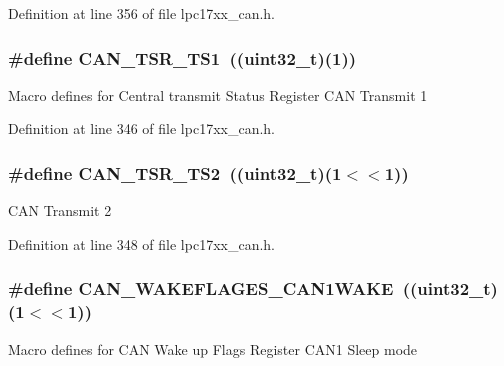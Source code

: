 \-Definition at line 356 of file lpc17xx\-\_\-can.\-h.

\hypertarget{group___c_a_n___private___macros_ga8f089fc39cd19120472ef0262bdad557}{
\subsubsection[{\-C\-A\-N\-\_\-\-T\-S\-R\-\_\-\-T\-S1}]{\setlength{\rightskip}{0pt plus 5cm}\#define {\bf \-C\-A\-N\-\_\-\-T\-S\-R\-\_\-\-T\-S1}~((uint32\-\_\-t)(1))}}\label{group___c_a_n___private___macros_ga8f089fc39cd19120472ef0262bdad557}
\-Macro defines for \-Central transmit \-Status \-Register \-C\-A\-N \-Transmit 1 

\-Definition at line 346 of file lpc17xx\-\_\-can.\-h.

\hypertarget{group___c_a_n___private___macros_ga5dbea4a4e383d12856abf6bd5ef999c9}{
\subsubsection[{\-C\-A\-N\-\_\-\-T\-S\-R\-\_\-\-T\-S2}]{\setlength{\rightskip}{0pt plus 5cm}\#define {\bf \-C\-A\-N\-\_\-\-T\-S\-R\-\_\-\-T\-S2}~((uint32\-\_\-t)(1$<$$<$1))}}\label{group___c_a_n___private___macros_ga5dbea4a4e383d12856abf6bd5ef999c9}
\-C\-A\-N \-Transmit 2 

\-Definition at line 348 of file lpc17xx\-\_\-can.\-h.

\hypertarget{group___c_a_n___private___macros_gaeb39a6e2c95f0eef298cb713d0cc2cd2}{
\subsubsection[{\-C\-A\-N\-\_\-\-W\-A\-K\-E\-F\-L\-A\-G\-E\-S\-\_\-\-C\-A\-N1\-W\-A\-K\-E}]{\setlength{\rightskip}{0pt plus 5cm}\#define {\bf \-C\-A\-N\-\_\-\-W\-A\-K\-E\-F\-L\-A\-G\-E\-S\-\_\-\-C\-A\-N1\-W\-A\-K\-E}~((uint32\-\_\-t)(1$<$$<$1))}}\label{group___c_a_n___private___macros_gaeb39a6e2c95f0eef298cb713d0cc2cd2}
\-Macro defines for \-C\-A\-N \-Wake up \-Flags \-Register \-C\-A\-N1 \-Sleep mode 

